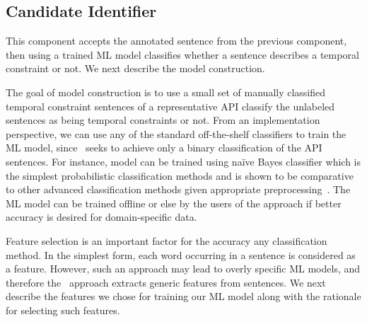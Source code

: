 \subsection{Candidate Identifier}

This component accepts the annotated sentence from the previous component,
then using a trained ML model classifies whether a sentence describes a temporal constraint or not. We next describe the model construction.

The goal of model construction is to use a small set of manually classified temporal constraint sentences of a representative API classify the unlabeled sentences as being temporal constraints or not.
From an implementation perspective, we can use any of the standard off-the-shelf classifiers to train the ML model, since \tool\ seeks to achieve only a binary classification of the API sentences.
For instance, model can be trained using na{\"i}ve Bayes classifier which is the simplest probabilistic classification methods and is shown to be comparative to other advanced classification methods given appropriate preprocessing~\cite{rennie2003tackling}.
The ML model can be trained offline or else by the users of the approach if better accuracy is desired for domain-specific data.

Feature selection is an important factor for the accuracy any classification method.
In the simplest form, each word occurring in a sentence is considered as a feature. However, such an approach may lead to overly specific ML models, and therefore the \tool\ approach extracts generic features from sentences. We next describe the features we chose for training our ML model along with the rationale for selecting such features.

